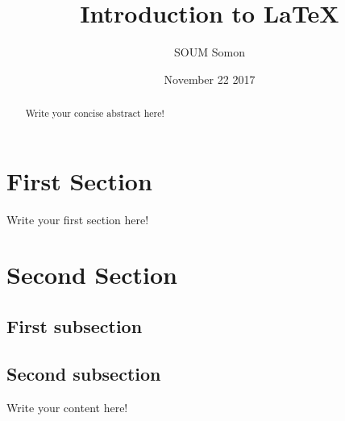 \documentclass[10pt, a5paper]{article}
\title{Introduction to \LaTeX{}}
\author{SOUM Somon}
\date{November 22 2017}
\begin{document}
	\maketitle
	\begin{abstract}
		Write your concise abstract here!
	\end{abstract}
	\tableofcontents
	\newpage
	\section{First Section}
	Write your first section here!
	\section{Second Section}
	\subsection{First subsection}
	\subsection{Second subsection}
	Write your content here!
\end{document}
